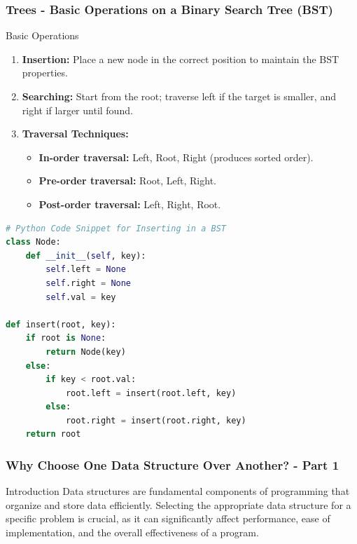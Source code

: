 \documentclass{beamer}
\begin{document}
\begin{frame}[fragile]
    \frametitle{Trees - Basic Operations on a Binary Search Tree (BST)}
    \begin{block}{Basic Operations}
        \begin{enumerate}
            \item \textbf{Insertion:} Place a new node in the correct position to maintain the BST properties.
            \item \textbf{Searching:} Start from the root; traverse left if the target is smaller, and right if larger until found.
            \item \textbf{Traversal Techniques:}
            \begin{itemize}
                \item \textbf{In-order traversal:} Left, Root, Right (produces sorted order).
                \item \textbf{Pre-order traversal:} Root, Left, Right.
                \item \textbf{Post-order traversal:} Left, Right, Root.
            \end{itemize}
        \end{enumerate}
    \end{block}

    \begin{lstlisting}[language=Python]
# Python Code Snippet for Inserting in a BST
class Node:
    def __init__(self, key):
        self.left = None
        self.right = None
        self.val = key

def insert(root, key):
    if root is None:
        return Node(key)
    else:
        if key < root.val:
            root.left = insert(root.left, key)
        else:
            root.right = insert(root.right, key)
    return root
    \end{lstlisting}
\end{frame}

\begin{frame}[fragile]
    \frametitle{Why Choose One Data Structure Over Another? - Part 1}
    \begin{block}{Introduction}
        Data structures are fundamental components of programming that organize and store data efficiently. Selecting the appropriate data structure for a specific problem is crucial, as it can significantly affect performance, ease of implementation, and the overall effectiveness of a program.
    \end{block}
\end{frame}
\end{document}

